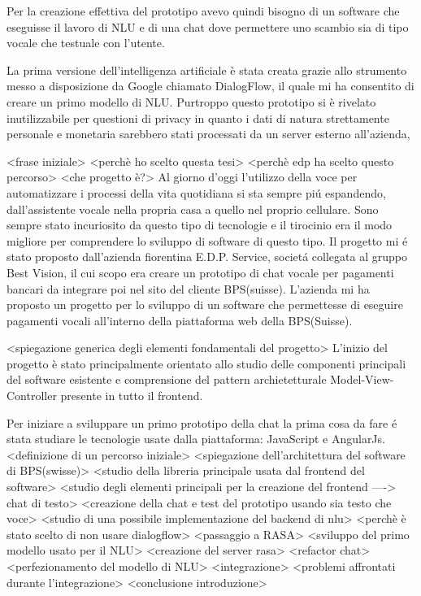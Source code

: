 Per la creazione effettiva del prototipo avevo quindi bisogno di un software che eseguisse il lavoro di NLU e di una chat dove permettere uno scambio sia di tipo vocale che testuale con l’utente.

La prima versione dell’intelligenza artificiale è stata creata grazie allo strumento messo a disposizione da Google chiamato DialogFlow, il quale mi ha consentito di creare un primo modello di NLU. Purtroppo questo prototipo si è rivelato inutilizzabile per questioni di privacy in quanto i dati di natura strettamente personale e monetaria sarebbero stati processati da un server esterno all’azienda, 





<frase iniziale> 
<perchè ho scelto questa tesi>
<perchè edp ha scelto questo percorso>
<che progetto è?>
Al giorno d'oggi l'utilizzo della voce per automatizzare i processi della vita quotidiana si sta sempre pi\'u espandendo, dall'assistente vocale nella propria casa a quello nel proprio cellulare. Sono sempre stato incuriosito da questo tipo di tecnologie e il tirocinio era il modo migliore per comprendere lo sviluppo di software di questo tipo. Il progetto mi \'e stato proposto dall'azienda fiorentina E.D.P. Service, societ\'a collegata al gruppo Best Vision, il cui scopo era creare un prototipo di chat vocale per pagamenti bancari da integrare poi nel sito del cliente BPS(suisse).
L'azienda mi ha proposto un progetto per lo sviluppo di un software che permettesse di eseguire pagamenti vocali all'interno della piattaforma web della BPS(Suisse).

<spiegazione generica degli elementi fondamentali del progetto>
L'inizio del progetto è stato principalmente orientato allo studio delle componenti principali del software esistente e comprensione del pattern archietetturale Model-View-Controller presente in tutto il frontend.

Per iniziare a sviluppare un primo prototipo della chat la prima cosa da fare \'e stata studiare le tecnologie usate dalla piattaforma: JavaScript e AngularJs.  
<definizione di un percorso iniziale>
<spiegazione dell'architettura del software di BPS(swisse)>
<studio della libreria principale usata dal frontend del software>
<studio degli elementi principali per la creazione del frontend ----> chat di testo>
<creazione della chat e test del prototipo usando sia testo che voce>
<studio di una possibile implementazione del backend di nlu>
<perchè è stato scelto di non usare dialogflow>
<passaggio a RASA>
<sviluppo del primo modello usato per il NLU>
<creazione del server rasa>
<refactor chat>
<perfezionamento del modello di NLU>
<integrazione>
<problemi affrontati durante l'integrazione>
<conclusione introduzione>
